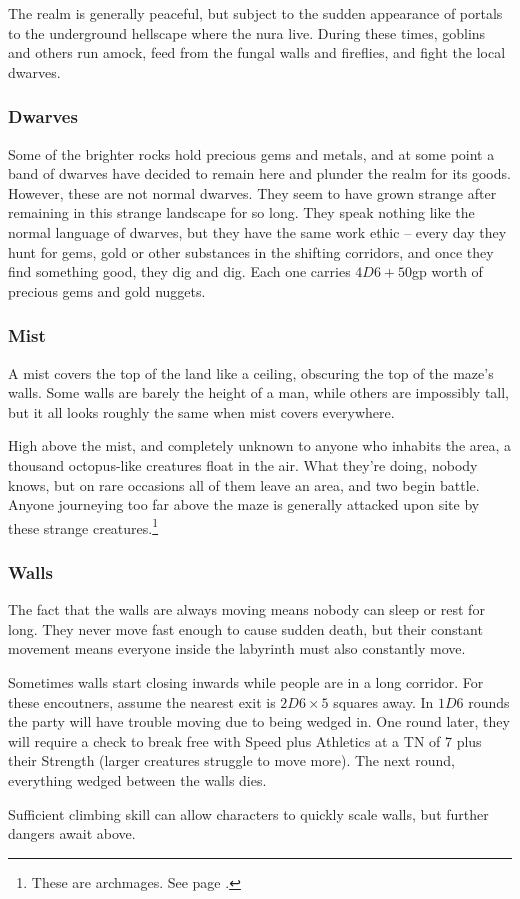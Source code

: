 \begin{multicols}{2}
The realm is generally peaceful, but subject to the sudden appearance of portals to the underground hellscape where the nura live.  During these times, goblins and others run amock, feed from the fungal walls and fireflies, and fight the local dwarves.

\subsubsection{Dwarves}

Some of the brighter rocks hold precious gems and metals, and at some point a band of dwarves have decided to remain here and plunder the realm for its goods.
However, these are not normal dwarves.
They seem to have grown strange after remaining in this strange landscape for so long.
They speak nothing like the normal language of dwarves, but they have the same work ethic -- every day they hunt for gems, gold or other substances in the shifting corridors, and once they find something good, they dig and dig.
Each one carries $4D6 + 50$gp worth of precious gems and gold nuggets.

\subsubsection{Mist}

A mist covers the top of the land like a ceiling, obscuring the top of the maze's walls.  Some walls are barely the height of a man, while others are impossibly tall, but it all looks roughly the same when mist covers everywhere.

High above the mist, and completely unknown to anyone who inhabits the area, a thousand octopus-like creatures float in the air.
What they're doing, nobody knows, but on rare occasions all of them leave an area, and two begin battle.
Anyone journeying too far above the maze is generally attacked upon site by these strange creatures.\footnote{These are archmages. See page \pageref{archmage}.}

\subsubsection{Walls}

The fact that the walls are always moving means nobody can sleep or rest for long.
They never move fast enough to cause sudden death, but their constant movement means everyone inside the labyrinth must also constantly move.

Sometimes walls start closing inwards while people are in a long corridor.
For these encoutners, assume the nearest exit is $2D6\times 5$ squares away.
In $1D6$ rounds the party will have trouble moving due to being wedged in.
One round later, they will require a check to break free with Speed plus Athletics at a TN of 7 plus their Strength (larger creatures struggle to move more).  The next round, everything wedged between the walls dies. 

Sufficient climbing skill can allow characters to quickly scale walls, but further dangers await above.

\end{multicols}

